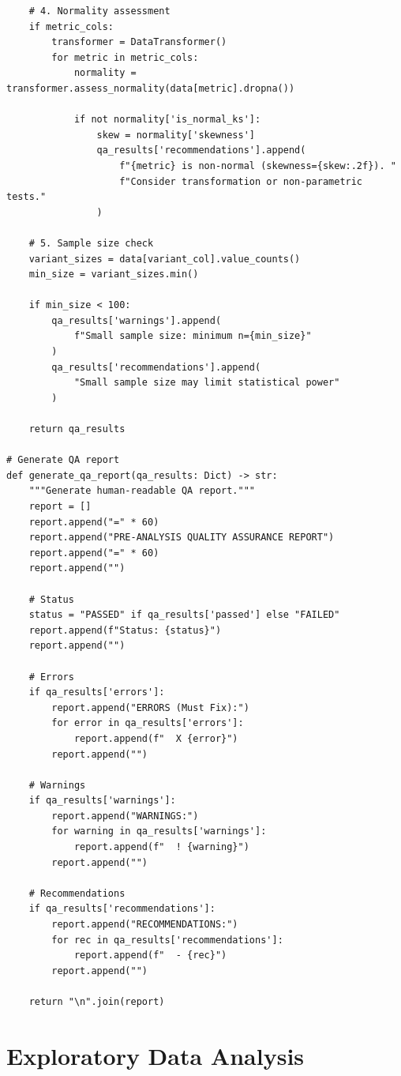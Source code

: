 \begin{lstlisting}
    # 4. Normality assessment
    if metric_cols:
        transformer = DataTransformer()
        for metric in metric_cols:
            normality = transformer.assess_normality(data[metric].dropna())

            if not normality['is_normal_ks']:
                skew = normality['skewness']
                qa_results['recommendations'].append(
                    f"{metric} is non-normal (skewness={skew:.2f}). "
                    f"Consider transformation or non-parametric tests."
                )

    # 5. Sample size check
    variant_sizes = data[variant_col].value_counts()
    min_size = variant_sizes.min()

    if min_size < 100:
        qa_results['warnings'].append(
            f"Small sample size: minimum n={min_size}"
        )
        qa_results['recommendations'].append(
            "Small sample size may limit statistical power"
        )

    return qa_results

# Generate QA report
def generate_qa_report(qa_results: Dict) -> str:
    """Generate human-readable QA report."""
    report = []
    report.append("=" * 60)
    report.append("PRE-ANALYSIS QUALITY ASSURANCE REPORT")
    report.append("=" * 60)
    report.append("")

    # Status
    status = "PASSED" if qa_results['passed'] else "FAILED"
    report.append(f"Status: {status}")
    report.append("")

    # Errors
    if qa_results['errors']:
        report.append("ERRORS (Must Fix):")
        for error in qa_results['errors']:
            report.append(f"  X {error}")
        report.append("")

    # Warnings
    if qa_results['warnings']:
        report.append("WARNINGS:")
        for warning in qa_results['warnings']:
            report.append(f"  ! {warning}")
        report.append("")

    # Recommendations
    if qa_results['recommendations']:
        report.append("RECOMMENDATIONS:")
        for rec in qa_results['recommendations']:
            report.append(f"  - {rec}")
        report.append("")

    return "\n".join(report)
\end{lstlisting}

\section{Exploratory Data Analysis}

